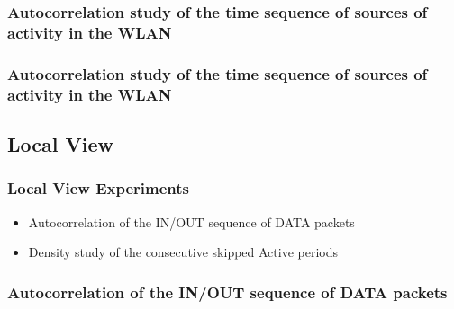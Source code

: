 \documentclass[9pt,handout,serif]{beamer}
\begin{document}
\subsubsection*{Autocorrelation study of the time sequence of sources of activity in the WLAN}
\begin{frame}[c]
	\frametitle{Autocorrelation study of the time sequence of sources of activity in the WLAN}
\end{frame}

\subsection{Local View}
\begin{frame}[c]
	\frametitle{Local View Experiments}
	\begin{itemize}
		\item Autocorrelation of the IN/OUT sequence of DATA packets
		\item Density study of the consecutive skipped Active periods
	\end{itemize}
\end{frame}

\subsubsection*{Autocorrelation of the IN/OUT sequence of DATA packets}
\end{document}
